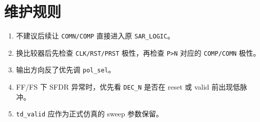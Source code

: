 \documentclass[11pt,a4paper,UTF8]{ctexart}
\begin{document}
\section{维护规则}

\begin{enumerate}
    \item 不建议后续让 \texttt{COMN/COMP} 直接进入原 \texttt{SAR\_LOGIC}。
    \item 换比较器后先检查 \texttt{CLK/RST/PRST} 极性，再检查 \texttt{P>N} 对应的 \texttt{COMP/COMN} 极性。
    \item 输出方向反了优先调 \texttt{pol\_sel}。
    \item FF/FS 下 SFDR 异常时，优先看 \texttt{DEC\_N} 是否在 reset 或 valid 前出现低脉冲。
    \item \texttt{td\_valid} 应作为正式仿真的 sweep 参数保留。
\end{enumerate}
\end{document}
